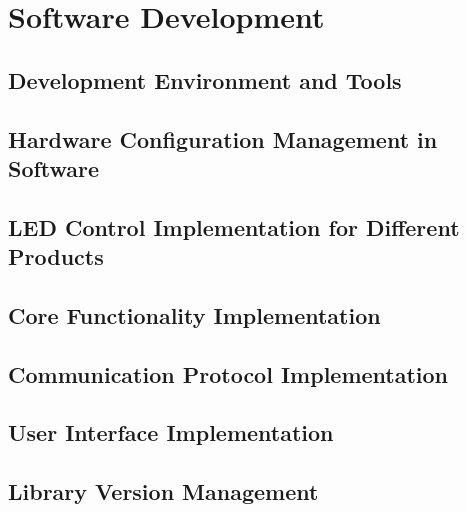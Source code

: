 \section{Software Development}
\label{sec:software_development}
\subsection{Development Environment and Tools}
\subsection{Hardware Configuration Management in Software}
\subsection{LED Control Implementation for Different Products}
\subsection{Core Functionality Implementation}
\subsection{Communication Protocol Implementation}
\subsection{User Interface Implementation}
\subsection{Library Version Management}
